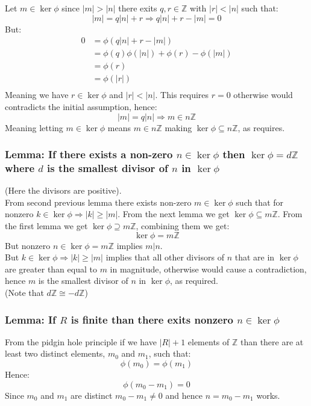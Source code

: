 Let $m\in\ker\phi$ since $|m| > |n|$ there exits $q,r \in \mathbb{Z}$ with $|r| < |n|$ such that:
\[|m| = q|n|+r \Rightarrow q|n|+r-|m| = 0\]
But:
\begin{equation*}
\begin{aligned}
	0&=\phi(q|n|+r-|m|)\\
	&=\phi(q)\phi(|n|)+\phi(r)-\phi(|m|)\\
	&=\phi(r) \\
	&=\phi(|r|) \\
\end{aligned}
\end{equation*}
Meaning we have $r\in\ker\phi$ and $|r| < |n|$.
This requires $r=0$ otherwise would contradicts the initial assumption, hence:
\[|m| = q|n| \Rightarrow m \in n\mathbb{Z}\]
Meaning letting $m\in\ker\phi$ means $m\in n\mathbb{Z}$ making $\ker\phi \subseteq n\mathbb{Z}$, 
as requires.

\subsubsection{Lemma: If there exists a non-zero $n\in\ker\phi$ then $\ker\phi=d\mathbb{Z}$ where $d$ is the smallest divisor of $n$ in $\ker\phi$}
(Here the divisors are positive).
\\

From second previous lemma there exists non-zero $m\in\ker\phi$ such that for nonzero $k\in\ker\phi\Rightarrow|k|\geq|m|$.
From the next lemma we get $\ker\phi \subseteq m\mathbb{Z}$.
From the first lemma we get $\ker\phi \supseteq m\mathbb{Z}$,
combining them we get:
\[\ker\phi = m\mathbb{Z}\]
But nonzero $n \in\ker\phi = m\mathbb{Z}$ implies $m|n$.
\\

But $k\in\ker\phi\Rightarrow|k|\geq|m|$ implies that all other divisors of $n$ that are in $\ker\phi$ are greater than equal to $m$ in magnitude,
otherwise would cause a contradiction,
hence $m$ is the smallest divisor of $n$ in $\ker\phi$,
as required.
\\

(Note that $d\mathbb{Z}\cong-d\mathbb{Z}$)

\subsubsection{Lemma: If $R$ is finite than there exits nonzero $n\in\ker\phi$}
From the pidgin hole principle if we have $|R|+1$ elements of $\mathbb{Z}$ than there are at least two distinct elements,
$m_0$ and $m_1$,
such that:
\[\phi(m_0)=\phi(m_1)\]
Hence:
\[\phi(m_0-m_1)=0\]
Since $m_0$ and $m_1$ are distinct $m_0-m_1\neq 0$ and hence $n=m_0-m_1$ works.

